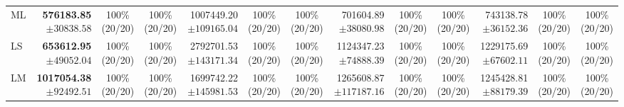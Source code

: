 \documentclass[10pt]{article}
\begin{document}
\begin{table}[!htbp]
\begin{tabular}{@{}l*{4}{rcc}@{}}
ML & \shortstack[r]{\textbf{576183.85}\\$\pm 30838.58$} & \shortstack[c]{100\%\\(20/20)} & \shortstack[c]{100\%\\(20/20)} & \shortstack[r]{1007449.20\\$\pm 109165.04$} & \shortstack[c]{100\%\\(20/20)} & \shortstack[c]{100\%\\(20/20)} & \shortstack[r]{701604.89\\$\pm 38080.98$} & \shortstack[c]{100\%\\(20/20)} & \shortstack[c]{100\%\\(20/20)} & \shortstack[r]{743138.78\\$\pm 36152.36$} & \shortstack[c]{100\%\\(20/20)} & \shortstack[c]{100\%\\(20/20)} \\
LS & \shortstack[r]{\textbf{653612.95}\\$\pm 49052.04$} & \shortstack[c]{100\%\\(20/20)} & \shortstack[c]{100\%\\(20/20)} & \shortstack[r]{2792701.53\\$\pm 143171.34$} & \shortstack[c]{100\%\\(20/20)} & \shortstack[c]{100\%\\(20/20)} & \shortstack[r]{1124347.23\\$\pm 74888.39$} & \shortstack[c]{100\%\\(20/20)} & \shortstack[c]{100\%\\(20/20)} & \shortstack[r]{1229175.69\\$\pm 67602.11$} & \shortstack[c]{100\%\\(20/20)} & \shortstack[c]{100\%\\(20/20)} \\
LM & \shortstack[r]{\textbf{1017054.38}\\$\pm 92492.51$} & \shortstack[c]{100\%\\(20/20)} & \shortstack[c]{100\%\\(20/20)} & \shortstack[r]{1699742.22\\$\pm 145981.53$} & \shortstack[c]{100\%\\(20/20)} & \shortstack[c]{100\%\\(20/20)} & \shortstack[r]{1265608.87\\$\pm 117187.16$} & \shortstack[c]{100\%\\(20/20)} & \shortstack[c]{100\%\\(20/20)} & \shortstack[r]{1245428.81\\$\pm 88179.39$} & \shortstack[c]{100\%\\(20/20)} & \shortstack[c]{100\%\\(20/20)} \\

\end{tabular}
\end{table}
\end{document}
